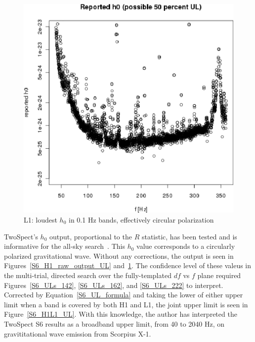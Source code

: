 \begin{figure}
\begin{center}
\includegraphics[width=0.5\paperwidth,height=0.35\paperheight]{plots/h0FullUL50log-L1.eps}
\caption{
L1: loudest $h_0$ in 0.1 Hz bands, effectively circular polarization}
\label{S6_L1_raw_output_UL}
\end{center}
\end{figure}

TwoSpect's $h_0$ output, proportional to the $R$ statistic, has been tested and is informative for the all-sky search~\cite{GoetzTwoSpectMethods2011,GoetzTwoSpectResults2014}.
This $h_0$ value corresponds to a circularly polarized gravitational wave.
Without any corrections, the output is seen in Figures~\ref{S6_H1_raw_output_UL} and~\ref{S6_L1_raw_output_UL}.
The confidence level of these valeus in the multi-trial, directed search over the fully-templated $df$ vs $f$ plane required Figures~\ref{S6_ULs_142}, \ref{S6_ULs_162}, and \ref{S6_ULs_222} to interpret. 
Corrected by Equation~\ref{S6_UL_formula} and taking the lower of either upper limit when a band is covered by both H1 and L1, the joint upper limit is seen in Figure~\ref{S6_H1L1_UL}.
With this knowledge, the author has interpreted the TwoSpect S6 results as a broadband upper limit, from 40 to 2040 Hz, on gravititational wave emission from Scorpius X-1.
